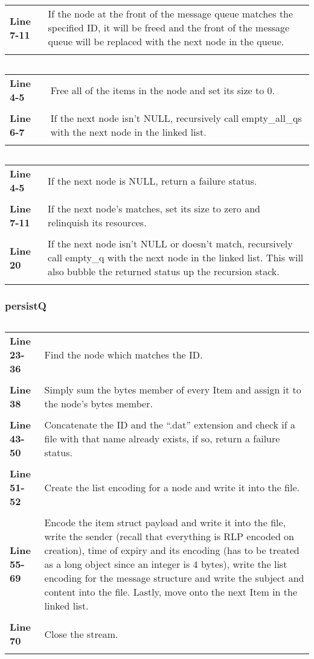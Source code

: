 \documentclass[a4paper, 12pt, titlepage]{article}
\newenvironment{code}{\captionsetup{type=listing}}{}
\newcommand{\sourcecode}[3]{
    \begin{code}
      \inputminted[linenos,numbersep=5pt,gobble=0,frame=lines,framesep=2mm,]{c}{#1}
        \caption{#2}
        \label{lst: #3}
    \end{code}
  }
\newcommand{\explainline}[2]{
  \textbf{Line #1} & #2 \\ \\
}
\begin{document}
\begin{onehalfspacing}
   \begin{longtable}{l p{10cm}}
     \explainline{7-11}{If the node at the front of the message queue matches the specified ID, it will be freed and the front of the message queue will be replaced with the next node in the queue.}
   \end{longtable}


    \sourcecode{snippets/task2b/empty_all_qs.c}{empty\_all\_qs helper function}{empty_all_qs}

   \begin{longtable}{l p{10cm}}
     \explainline{4-5}{Free all of the items in the node and set its size to 0.}
     \explainline{6-7}{If the next node isn't NULL, recursively call empty\_all\_qs with the next node in the linked list.}
   \end{longtable}

   \sourcecode{snippets/task2b/empty_q.c}{empty\_q helper function}{empty_q}

   \begin{longtable}{l p{10cm}}
     \explainline{4-5}{If the next node is NULL, return a failure status.}
     \explainline{7-11}{If the next node's matches, set its size to zero and relinquish its resources.}
     \explainline{20}{If the next node isn't NULL or doesn't match, recursively call empty\_q with the next node in the linked list. This will also bubble the returned status up the recursion stack.}
   \end{longtable}

   \subsubsection{persistQ}
   \sourcecode{snippets/task2b/persistQs.c}{persistQs method implementation}{task2b_persistQs}
      \begin{longtable}{l p{10cm}}
     \explainline{23-36}{Find the node which matches the ID.}
     \explainline{38}{Simply sum the bytes member of every Item and assign it to the node's bytes member.}
     \explainline{43-50}{Concatenate the ID and the ``.dat'' extension and check if a file with that name already exists, if so, return a failure status.}
     \explainline{51-52}{Create the list encoding for a node and write it into the file.}
     \explainline{55-69}{Encode the item struct payload and write it into the file, write the sender (recall that everything is RLP encoded on creation), time of expiry and its encoding (has to be treated as a long object since an integer is 4 bytes), write the list encoding for the message structure and write the subject and content into the file. Lastly, move onto the next Item in the linked list.}
     \explainline{70}{Close the stream.}
   \end{longtable}


\end{onehalfspacing}
\end{document}
